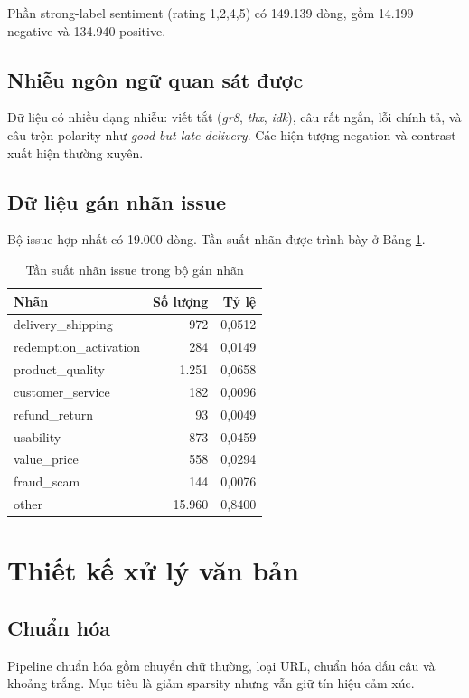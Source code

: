 ﻿\documentclass[12pt,a4paper]{article}
\begin{document}
Phần strong-label sentiment (rating 1,2,4,5) có 149.139 dòng, gồm 14.199 negative và 134.940 positive.

\subsection{Nhiễu ngôn ngữ quan sát được}
Dữ liệu có nhiều dạng nhiễu: viết tắt (\textit{gr8}, \textit{thx}, \textit{idk}), câu rất ngắn, lỗi chính tả, và câu trộn polarity như \textit{good but late delivery}. Các hiện tượng negation và contrast xuất hiện thường xuyên.

\subsection{Dữ liệu gán nhãn issue}
Bộ issue hợp nhất có 19.000 dòng. Tần suất nhãn được trình bày ở Bảng \ref{tab:issue_freq_vi}.

\begin{table}[H]
\centering
\caption{Tần suất nhãn issue trong bộ gán nhãn}
\label{tab:issue_freq_vi}
\begin{tabular}{lrr}
\toprule
Nhãn & Số lượng & Tỷ lệ \\
\midrule
delivery\_shipping & 972 & 0,0512 \\
redemption\_activation & 284 & 0,0149 \\
product\_quality & 1.251 & 0,0658 \\
customer\_service & 182 & 0,0096 \\
refund\_return & 93 & 0,0049 \\
usability & 873 & 0,0459 \\
value\_price & 558 & 0,0294 \\
fraud\_scam & 144 & 0,0076 \\
other & 15.960 & 0,8400 \\
\bottomrule
\end{tabular}
\end{table}

\section{Thiết kế xử lý văn bản}
\subsection{Chuẩn hóa}
Pipeline chuẩn hóa gồm chuyển chữ thường, loại URL, chuẩn hóa dấu câu và khoảng trắng. Mục tiêu là giảm sparsity nhưng vẫn giữ tín hiệu cảm xúc.
\end{document}
